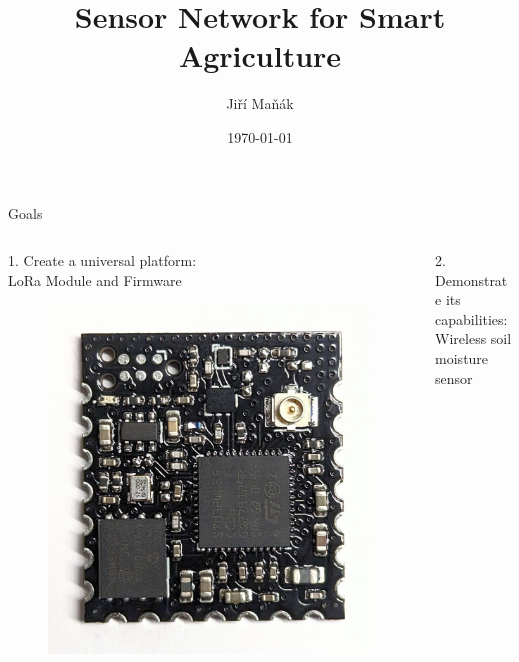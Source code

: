 \documentclass[hyphens]{beamer}
\title{Sensor Network for Smart Agriculture}
\author{Jiří Maňák}
\date{\today}
\begin{document}
\setlength{\leftmargini}{0.5cm}
\setlength{\leftmarginii}{0.5cm}

\begin{frame}
\titlepage
\end{frame}


\begin{frame}{Goals}
\begin{columns}[T]
\begin{column}{.5\textwidth}
    1. Create a universal platform:\\
    LoRa Module and Firmware
    \begin{figure}
        \centering
        \includegraphics[width=\linewidth]{img/module-v0.1.jpg}
    \end{figure}
\end{column}
\hfil
\begin{column}{.5\textwidth}
    2. Demonstrate its capabilities:\\
    Wireless soil moisture sensor
    \begin{figure}
        \centering

\end{figure}
\end{column}
\end{columns}
\end{frame}
\end{document}
